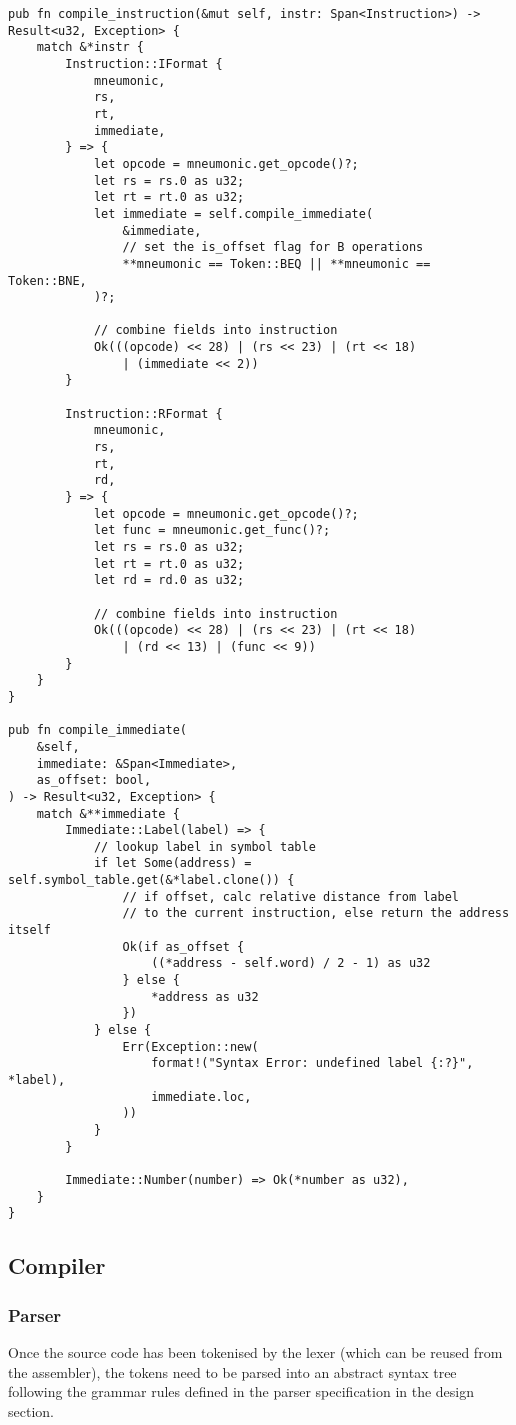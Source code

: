 \begin{lstlisting}
pub fn compile_instruction(&mut self, instr: Span<Instruction>) -> Result<u32, Exception> {
    match &*instr {
        Instruction::IFormat {
            mneumonic,
            rs,
            rt,
            immediate,
        } => {
            let opcode = mneumonic.get_opcode()?;
            let rs = rs.0 as u32;
            let rt = rt.0 as u32;
            let immediate = self.compile_immediate(
                &immediate,
                // set the is_offset flag for B operations
                **mneumonic == Token::BEQ || **mneumonic == Token::BNE,
            )?;

            // combine fields into instruction
            Ok(((opcode) << 28) | (rs << 23) | (rt << 18) 
                | (immediate << 2))
        }

        Instruction::RFormat {
            mneumonic,
            rs,
            rt,
            rd,
        } => {
            let opcode = mneumonic.get_opcode()?;
            let func = mneumonic.get_func()?;
            let rs = rs.0 as u32;
            let rt = rt.0 as u32;
            let rd = rd.0 as u32;

            // combine fields into instruction
            Ok(((opcode) << 28) | (rs << 23) | (rt << 18) 
                | (rd << 13) | (func << 9))
        }
    }
}

pub fn compile_immediate(
    &self,
    immediate: &Span<Immediate>,
    as_offset: bool,
) -> Result<u32, Exception> {
    match &**immediate {
        Immediate::Label(label) => {
            // lookup label in symbol table
            if let Some(address) = self.symbol_table.get(&*label.clone()) {
                // if offset, calc relative distance from label 
                // to the current instruction, else return the address itself
                Ok(if as_offset {
                    ((*address - self.word) / 2 - 1) as u32
                } else {
                    *address as u32
                })
            } else {
                Err(Exception::new(
                    format!("Syntax Error: undefined label {:?}", *label),
                    immediate.loc,
                ))
            }
        }

        Immediate::Number(number) => Ok(*number as u32),
    }
}
\end{lstlisting}

\subsection{Compiler}
\subsubsection{Parser}
Once the source code has been tokenised by the lexer (which can be reused from the assembler), the tokens need to be parsed into an abstract syntax tree following the grammar rules defined in the parser specification in the design section. 
